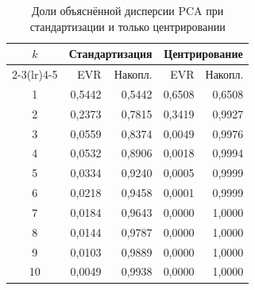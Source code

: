 \begin{table}[H]
\centering
\small
\caption{Доли объяснённой дисперсии PCA при стандартизации и только центрировании}\label{tab:pca}
\begin{tabular}{crrrr}
\toprule
$k$ & \multicolumn{2}{c}{Стандартизация} & \multicolumn{2}{c}{Центрирование} \\
\cmidrule(lr){2-3}\cmidrule(lr){4-5}
 & EVR & Накопл. & EVR & Накопл. \\
\midrule
1 & 0,5442 & 0,5442 & 0,6508 & 0,6508 \\
2 & 0,2373 & 0,7815 & 0,3419 & 0,9927 \\
3 & 0,0559 & 0,8374 & 0,0049 & 0,9976 \\
4 & 0,0532 & 0,8906 & 0,0018 & 0,9994 \\
5 & 0,0334 & 0,9240 & 0,0005 & 0,9999 \\
6 & 0,0218 & 0,9458 & 0,0001 & 0,9999 \\
7 & 0,0184 & 0,9643 & 0,0000 & 1,0000 \\
8 & 0,0144 & 0,9787 & 0,0000 & 1,0000 \\
9 & 0,0103 & 0,9889 & 0,0000 & 1,0000 \\
10 & 0,0049 & 0,9938 & 0,0000 & 1,0000 \\
\bottomrule
\end{tabular}
\end{table}
